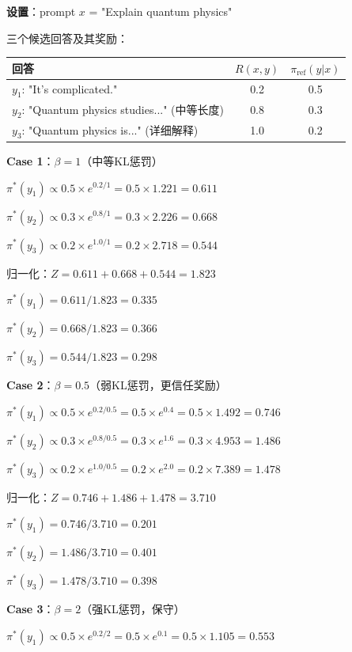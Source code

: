 \documentclass[11pt,a4paper]{article}
\theoremstyle{definition}
\begin{document}
\begin{calculation}[RLHF的详细数值例子]
\textbf{设置}：prompt $x$ = "Explain quantum physics"

三个候选回答及其奖励：
\begin{center}
\begin{tabular}{l|c|c}
\toprule
回答 & $R(x, y)$ & $\pi_{\text{ref}}(y|x)$ \\
\midrule
$y_1$: "It's complicated." & 0.2 & 0.5 \\
$y_2$: "Quantum physics studies..." (中等长度) & 0.8 & 0.3 \\
$y_3$: "Quantum physics is..." (详细解释) & 1.0 & 0.2 \\
\bottomrule
\end{tabular}
\end{center}

\textbf{Case 1}：$\beta = 1$（中等KL惩罚）

$\pi^*(y_1) \propto 0.5 \times e^{0.2/1} = 0.5 \times 1.221 = 0.611$

$\pi^*(y_2) \propto 0.3 \times e^{0.8/1} = 0.3 \times 2.226 = 0.668$

$\pi^*(y_3) \propto 0.2 \times e^{1.0/1} = 0.2 \times 2.718 = 0.544$

归一化：$Z = 0.611 + 0.668 + 0.544 = 1.823$

$\pi^*(y_1) = 0.611/1.823 = 0.335$

$\pi^*(y_2) = 0.668/1.823 = 0.366$

$\pi^*(y_3) = 0.544/1.823 = 0.298$

\textbf{Case 2}：$\beta = 0.5$（弱KL惩罚，更信任奖励）

$\pi^*(y_1) \propto 0.5 \times e^{0.2/0.5} = 0.5 \times e^{0.4} = 0.5 \times 1.492 = 0.746$

$\pi^*(y_2) \propto 0.3 \times e^{0.8/0.5} = 0.3 \times e^{1.6} = 0.3 \times 4.953 = 1.486$

$\pi^*(y_3) \propto 0.2 \times e^{1.0/0.5} = 0.2 \times e^{2.0} = 0.2 \times 7.389 = 1.478$

归一化：$Z = 0.746 + 1.486 + 1.478 = 3.710$

$\pi^*(y_1) = 0.746/3.710 = 0.201$

$\pi^*(y_2) = 1.486/3.710 = 0.401$

$\pi^*(y_3) = 1.478/3.710 = 0.398$

\textbf{Case 3}：$\beta = 2$（强KL惩罚，保守）

$\pi^*(y_1) \propto 0.5 \times e^{0.2/2} = 0.5 \times e^{0.1} = 0.5 \times 1.105 = 0.553$


\end{calculation}
\end{document}
